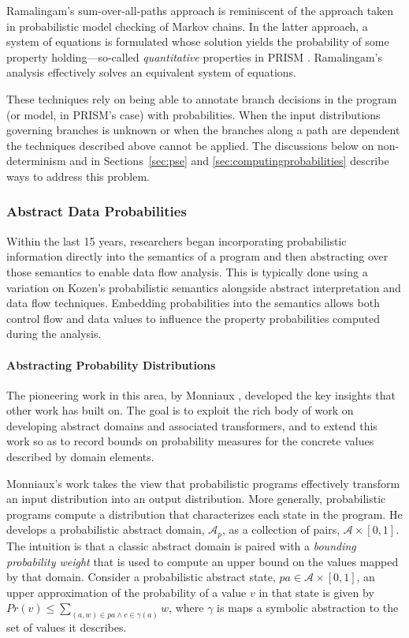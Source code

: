 Ramalingam's sum-over-all-paths approach is reminiscent of
the approach taken in probabilistic model checking of Markov chains.
In the latter approach, a system of equations is formulated
whose solution yields the probability of some property
holding---so-called \textit{quantitative} properties in 
PRISM \cite{kwiatkowska2010advances}.   Ramalingam's analysis
effectively solves an equivalent system of equations.  

These techniques rely on being able to annotate
branch decisions in the program (or model, in PRISM's case)
with probabilities.  When the input distributions governing
branches is unknown or when the branches along a path are 
dependent the techniques described above cannot be applied.
The discussions below on non-determinism and in Sections~\ref{sec:pse} 
and \ref{sec:computingprobabilities} describe ways
to address this problem.

\subsubsection{Abstract Data Probabilities}
Within the last 15 years, researchers 
began incorporating probabilistic information directly into
the semantics of a program and then abstracting over 
those semantics 
\cite{monniaux2000abstract,smith2008probabilistic,cousot2012probabilistic}
to enable data flow analysis.
This is typically done using a variation on Kozen's 
probabilistic semantics \cite{kozen1981semantics} 
alongside abstract interpretation and data flow techniques.
Embedding probabilities into the semantics allows 
both control flow and data values to influence
the property probabilities computed during the analysis.

\paragraph{Abstracting Probability Distributions}
The pioneering work in this area, by 
Monniaux \cite{monniaux2000abstract,monniaux2001backwards},
developed the key insights that other work has built on. 
The goal is to exploit the rich body of work on developing
abstract domains and associated transformers, and to extend this work 
so as to record bounds on probability measures for the concrete values
described by domain elements.

Monniaux's work takes the view that probabilistic programs 
effectively transform an input distribution into an output
distribution.  More generally, probabilistic programs compute 
a distribution that characterizes each state in the program.   
He develops a probabilistic abstract domain, $\mathcal{A}_p$, 
as a collection of pairs, $\mathcal{A} \times [0,1]$.
The intuition is that a classic abstract domain is paired
with a \textit{bounding probability weight} that is used
to compute an upper bound on the values mapped by that domain.
Consider a probabilistic abstract state, $pa \in \mathcal{A} \times [0,1]$,
an upper approximation of the probability of a value $v$
in that state is given by
$Pr(v) \le \sum_{(a,w) \in pa \wedge c \in \gamma(a)} w$,
where $\gamma$ is maps a symbolic abstraction to
the set of values it describes.

